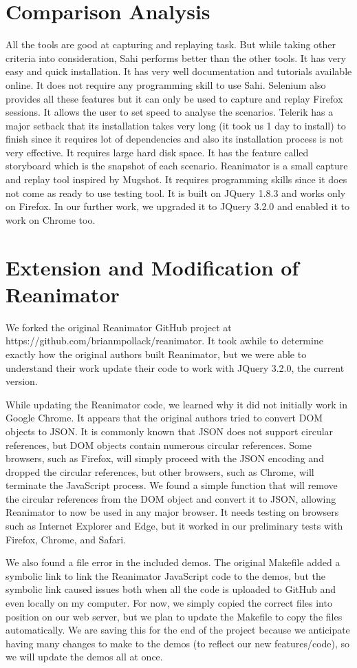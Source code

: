 \documentclass[12pt,journal]{IEEEtran}
\begin{document}
\section{Comparison Analysis}
All the tools are good at capturing and replaying task. But while taking other criteria into consideration, Sahi performs better than the other tools. It has very easy and quick installation. It has very well documentation and tutorials available online. It does not require any programming skill to use Sahi. Selenium also provides all these features but it can only be used to capture and replay Firefox sessions. It allows the user to set speed to analyse the scenarios. Telerik has a major setback that its installation takes very long (it took us 1 day to install) to finish since it requires lot of dependencies and also its installation process is not very effective. It requires large hard disk space. It has the feature called storyboard which is the snapshot of each scenario. Reanimator is a small capture and replay tool inspired by Mugshot. It requires programming skills since it does not come as ready to use testing tool. It is built on JQuery 1.8.3 and works only on Firefox. In our further work, we upgraded it to JQuery 3.2.0 and enabled it to work on Chrome too.

\section{Extension and Modification of Reanimator}
We forked the original Reanimator GitHub project at https://github.com/brianmpollack/reanimator. It took awhile to determine exactly how the original authors built Reanimator, but we were able to understand their work update their code to work with JQuery 3.2.0, the current version.

While updating the Reanimator code, we learned why it did not initially work in Google Chrome. It appears that the original authors tried to convert DOM objects to JSON. It is commonly known that JSON does not support circular references, but DOM objects contain numerous circular references. Some browsers, such as Firefox, will simply proceed with the JSON encoding and dropped the circular references, but other browsers, such as Chrome, will terminate the JavaScript process. We found a simple function that will remove the circular references from the DOM object and convert it to JSON, allowing Reanimator to now be used in any major browser. It needs testing on browsers such as Internet Explorer and Edge, but it worked in our preliminary tests with Firefox, Chrome, and Safari.

We also found a file error in the included demos. The original Makefile added a symbolic link to link the Reanimator JavaScript code to the demos, but the symbolic link caused issues both when all the code is uploaded to GitHub and even locally on my computer. For now, we simply copied the correct files into position on our web server, but we plan to update the Makefile to copy the files automatically. We are saving this for the end of the project because we anticipate having many changes to make to the demos (to reflect our new features/code), so we will update the demos all at once.



\printbibliography
\end{document}
